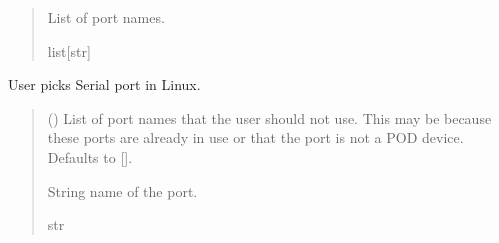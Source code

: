 \documentclass[letterpaper,10pt,english]{sphinxmanual}
\begin{document}
\begin{fulllineitems}
\begin{fulllineitems}
\begin{quote}
\begin{description}
\sphinxAtStartPar
List of port names.

\sphinxAtStartPar
list{[}str{]}

\end{description}\end{quote}

\end{fulllineitems}


\begin{fulllineitems}
\label{\detokenize{Morelia.Devices.SerialPorts:Morelia.Devices.SerialPorts.PortAccess.FindPorts._ChoosePortLinux}}
\pysigstartsignatures
{}
\pysigstopsignatures
\sphinxAtStartPar
User picks Serial port in Linux.
\begin{quote}\begin{description}
\sphinxAtStartPar
{} (\sphinxstyleliteralemphasis{\sphinxupquote{{[}}}\sphinxstyleliteralemphasis{\sphinxupquote{{]}}}\sphinxstyleliteralemphasis{\sphinxupquote{, }}) \textendash{} List of port names that the user should                 not use. This may be because these ports are already in use or that                 the port is not a POD device. Defaults to {[}{]}.

\sphinxAtStartPar
String name of the port.

\sphinxAtStartPar
str

\end{description}\end{quote}

\end{fulllineitems}



\end{fulllineitems}
\end{document}
